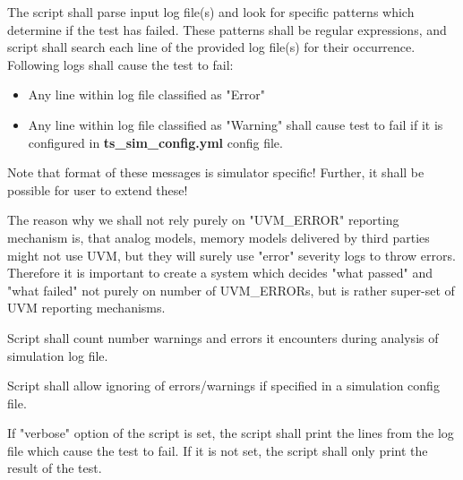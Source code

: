 \documentclass{tropic_design_spec}
\begin{document}
    {The script shall parse input log file(s) and look for specific patterns which
     determine if the test has failed. These patterns shall be regular expressions,
     and script shall search each line of the provided log file(s) for their occurrence.
     Following logs shall cause the test to fail:
\begin{itemize}
	\item{Any line within log file classified as "Error"}
	\item{Any line within log file classified as "Warning" shall cause test to fail if it
		  is configured in \textbf{ts_sim_config.yml} config file.}
\end{itemize}

    Note that format of these messages is simulator specific! Further, it shall be
    possible for user to extend these!

    The reason why we shall not rely purely on "UVM_ERROR" reporting mechanism is, that
    analog models, memory models delivered by third parties might not use UVM, but they
    will surely use "error" severity logs to throw errors. Therefore it is important to
    create a system which decides "what passed" and "what failed" not purely on number
    of UVM_ERRORs, but is rather super-set of UVM reporting mechanisms.
}



    {Script shall count number warnings and errors it encounters during analysis of
     simulation log file.}


    {Script shall allow ignoring of errors/warnings if specified in a simulation config
     file.}


    {If "verbose" option of the script is set, the script shall print the lines from the
     log file which cause the test to fail. If it is not set, the script shall only print
     the result of the test.}


\ReqEnd


\pagebreak
\end{document}
